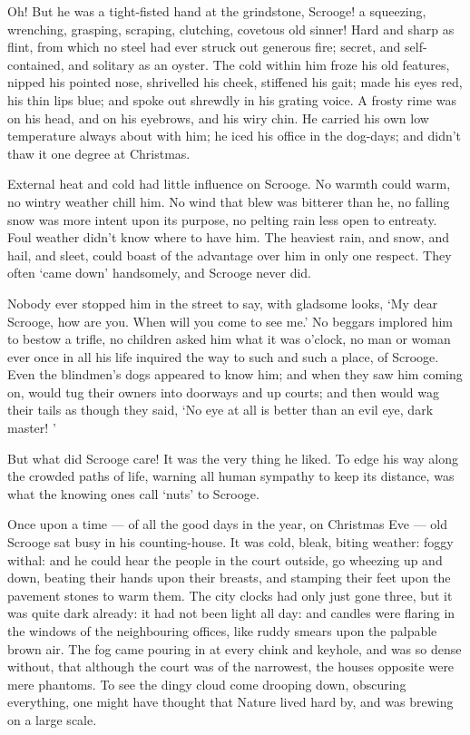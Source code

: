 \documentclass[11pt,twoside]{article}\makeatletter
\begin{document}
Oh! But he was a tight-fisted hand at the grindstone, Scrooge! a squeezing, wrenching, grasping, scraping, clutching, covetous old sinner! Hard and sharp as flint, from which no steel had ever struck out generous fire; secret, and self-contained, and solitary as an oyster. The cold within him froze his old features, nipped his pointed nose, shrivelled his cheek, stiffened his gait; made his eyes red, his thin lips blue; and spoke out shrewdly in his grating voice. A frosty rime was on his head, and on his eyebrows, and his wiry chin. He  carried his own low temperature always about with him; he iced his office in the dog-days; and didn't thaw it one degree at Christmas.\par
External heat and cold had little influence on Scrooge. No warmth could warm, no wintry weather chill him. No wind that blew was bitterer than he, no falling snow was more intent upon its purpose, no pelting rain less open to entreaty. Foul weather didn't know where to have him. The heaviest rain, and snow, and hail, and sleet, could boast of the advantage over him in only one respect. They often ‘came down’ handsomely, and Scrooge never did.\par
Nobody ever stopped him in the street to say, with gladsome looks, ‘My dear Scrooge, how are you. When will you come to see me.’ No beggars implored him to bestow a trifle, no children asked him what it was o'clock, no man or woman ever once in all his life inquired the way to such and such a place, of Scrooge. Even the blindmen's dogs appeared to know him; and when they saw him coming on, would tug their owners into doorways  and up courts; and then would wag their tails as though they said, ‘No eye at all is better than an evil eye, dark master! ’\par
But what did Scrooge care! It was the very thing he liked. To edge his way along the crowded paths of life, warning all human sympathy to keep its distance, was what the knowing ones call ‘nuts’ to Scrooge.\par
Once upon a time — of all the good days in the year, on Christmas Eve — old Scrooge sat busy in his counting-house. It was cold, bleak, biting weather: foggy withal: and he could hear the people in the court outside, go wheezing up and down, beating their hands upon their breasts, and stamping their feet upon the pavement stones to warm them. The city clocks had only just gone three, but it was quite dark already: it had not been light all day: and candles were flaring in the windows of the neighbouring offices, like ruddy smears upon the palpable brown air. The fog came pouring in at every chink and keyhole, and was so dense without, that although the court was of the  narrowest, the houses opposite were mere phantoms. To see the dingy cloud come drooping down, obscuring everything, one might have thought that Nature lived hard by, and was brewing on a large scale.\par
\end{document}
